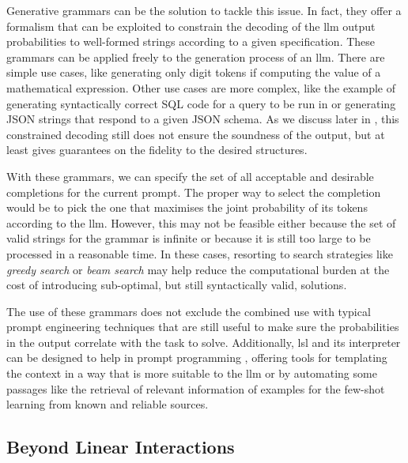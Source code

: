\documentclass[manuscript,screen]{acmart}
\begin{document}
Generative grammars can be the solution to tackle this issue.
In fact, they offer a formalism that can be exploited to constrain the decoding of the \ac{llm} output probabilities to well-formed strings according to a given specification.
These grammars can be applied freely to the generation process of an \ac{llm}.
There are simple use cases, like generating only digit tokens if computing the value of a mathematical expression.
Other use cases are more complex, like the example of generating syntactically correct SQL code for a query to be run in  or generating JSON strings that respond to a given JSON schema. %
As we discuss later in , this constrained decoding still does not ensure the soundness of the output, but at least gives guarantees on the fidelity to the desired structures.

With these grammars, we can specify the set of all acceptable and desirable completions for the current prompt.
The proper way to select the completion would be to pick the one that maximises the joint probability of its tokens according to the \ac{llm}.
However, this may not be feasible either because the set of valid strings for the grammar is infinite or because it is still too large to be processed in a reasonable time.
In these cases, resorting to search strategies like \emph{greedy search} or \emph{beam search} may help reduce the computational burden at the cost of introducing sub-optimal, but still syntactically valid, solutions.

The use of these grammars does not exclude the combined use with typical prompt engineering techniques that are still useful to make sure the probabilities in the output correlate with the task to solve.
Additionally, \ac{lsl} and its interpreter can be designed to help in prompt programming%
, offering tools for templating the context in a way that is more suitable to the \ac{llm} or by automating some passages like the retrieval of relevant information of examples for the few-shot learning from known and reliable sources.

\subsection{Beyond Linear Interactions}
\label{sec:beyondlinearinteractions}

\end{document}
